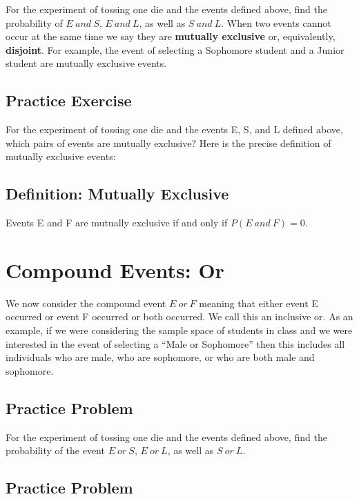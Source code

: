 \documentclass[]{book}
\theoremstyle{definition}
\theoremstyle{definition}
\theoremstyle{definition}
\theoremstyle{remark}
\begin{document}
For the experiment of tossing one die and the events defined above, find
the probability of \(E \ and \ S\), \(E \ and \ L\), as well as
\(S \ and \ L\). When two events cannot occur at the same time we say
they are \textbf{mutually exclusive} or, equivalently,
\textbf{disjoint}. For example, the event of selecting a Sophomore
student and a Junior student are mutually exclusive events.

\subsection{Practice Exercise}\label{practice-exercise-4}

For the experiment of tossing one die and the events E, S, and L defined
above, which pairs of events are mutually exclusive? Here is the precise
definition of mutually exclusive events:

\subsection{Definition: Mutually
Exclusive}\label{definition-mutually-exclusive}

Events E and F are mutually exclusive if and only if
\(P(E \ and \ F) =0\).

\section{Compound Events: Or}\label{compound_events_or}

We now consider the compound event \(E \ or \ F\) meaning that either
event E occurred or event F occurred or both occurred. We call this an
inclusive or. As an example, if we were considering the sample space of
students in class and we were interested in the event of selecting a
``Male or Sophomore'' then this includes all individuals who are male,
who are sophomore, or who are both male and sophomore.

\subsection{Practice Problem}\label{practice-problem}

For the experiment of tossing one die and the events defined above, find
the probability of the event \(E \ or \ S\), \(E \ or \ L\), as well as
\(S \ or \ L\).

\subsection{Practice Problem}\label{practice-problem-1}
\end{document}

